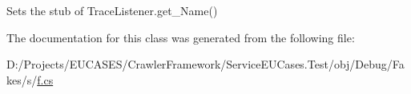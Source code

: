 Sets the stub of Trace\-Listener.\-get\-\_\-\-Name()



The documentation for this class was generated from the following file\-:\begin{DoxyCompactItemize}
\item 
D\-:/\-Projects/\-E\-U\-C\-A\-S\-E\-S/\-Crawler\-Framework/\-Service\-E\-U\-Cases.\-Test/obj/\-Debug/\-Fakes/s/\hyperlink{s_2f_8cs}{f.\-cs}\end{DoxyCompactItemize}
